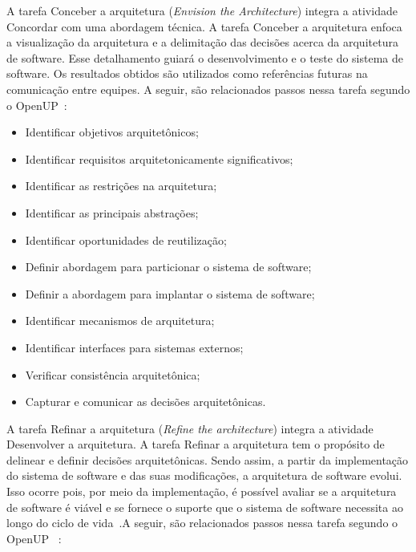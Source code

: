 %


A tarefa Conceber a arquitetura (\emph{Envision the Architecture}) integra a atividade Concordar com uma abordagem técnica. A tarefa Conceber a arquitetura enfoca a visualização da arquitetura e a delimitação das decisões acerca da arquitetura de software. Esse detalhamento guiará o desenvolvimento e o teste do sistema de software. Os resultados obtidos são utilizados como referências futuras na comunicação entre equipes. A seguir, são relacionados passos nessa tarefa segundo o OpenUP~\cite{openup}:

\begin{itemize}
    \item Identificar objetivos arquitetônicos;
    \item Identificar requisitos arquitetonicamente significativos;
    \item Identificar as restrições na arquitetura;
    \item Identificar as principais abstrações;
    \item Identificar oportunidades de reutilização;
    \item Definir abordagem para particionar o sistema de software;
    \item Definir a abordagem para implantar o sistema de software;
    \item Identificar mecanismos de arquitetura;
    \item Identificar interfaces para sistemas externos;
    \item Verificar consistência arquitetônica;
    \item Capturar e comunicar as decisões arquitetônicas.
\end{itemize}

A tarefa Refinar a arquitetura (\emph{Refine the architecture}) integra a atividade Desenvolver a arquitetura. A tarefa Refinar a arquitetura tem o propósito de delinear e definir decisões arquitetônicas. Sendo assim, a partir da implementação do sistema de software e das suas modificações, a arquitetura de software evolui. Isso ocorre pois, por meio da implementação, é possível avaliar se a arquitetura de software é viável e se fornece o suporte que o sistema de software necessita ao longo do ciclo de vida~\cite{openup}.A seguir, são relacionados passos nessa tarefa segundo o OpenUP ~\cite{openup}:

